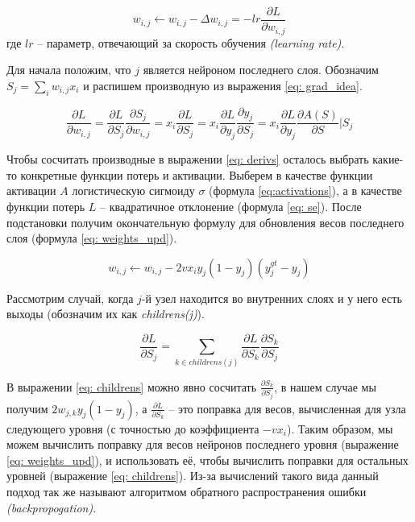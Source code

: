 \begin{equation}\label{eq: grad_idea}
    w_{i, j} \leftarrow w_{i, j} - \Delta w_{i,j} = - lr \frac{\partial L}{\partial w_{i, j}}
\end{equation}
где $lr$ -- параметр, отвечающий за скорость обучения \textit{(learning rate)}.

Для начала положим, что $j$ является 
нейроном последнего слоя. Обозначим $S_{j} = \sum_{i} w_{i, j} x_{i}$ и
распишем производную из выражения \ref{eq: grad_idea}.

\begin{equation}\label{eq: derivs}
    \frac{\partial L}{\partial w_{i, j}} = 
    \frac{\partial L}{\partial S_j} \frac{\partial S_j}{\partial w_{i, j}} =
    x_i \frac{\partial L}{\partial S_j} =
    x_i \frac{\partial L}{\partial y_j} \frac{\partial y_j}{\partial S_j} =
    x_i \frac{\partial L}{\partial y_j}  \frac{\partial A(S)}{\partial S} | S_j
\end{equation}

Чтобы сосчитать производные в выражении \ref{eq: derivs} осталось выбрать какие-то конкретные
функции потерь и активации. Выберем в качестве функции активации $A$ 
логистическую сигмоиду $\sigma$ (формула \ref{eq:activations}), а в качестве функции потерь
$L$ -- квадратичное отклонение (формула \ref{eq: se}). После подстановки получим
окончательную формулу для обновления весов последнего слоя (формула \ref{eq: weights_upd}).

\begin{equation}\label{eq: weights_upd}
    w_{i, j} \leftarrow w_{i, j} - 2 v x_i y_j (1 - y_j) (y^{gt}_j - y_j)
\end{equation}

Рассмотрим случай, когда $j$-й узел находится во внутренних слоях и 
у него есть выходы (обозначим их как \textit{childrens(j)}).

\begin{equation}\label{eq: childrens}
    \frac{\partial L}{\partial S_j} = 
    \sum_{k \in childrens(j)} \frac{\partial L}{\partial S_k} \frac{\partial S_k}{\partial S_j} 
\end{equation}


\indent
\indent
В выражении \ref{eq: childrens} можно явно сосчитать 
$\frac{\partial S_k}{\partial S_j}$, в нашем случае мы получим 
$2 w_{j, k} y_j (1 - y_j)$, а $\frac{\partial L}{\partial S_k}$ -- это поправка для весов, вычисленная для узла 
следующего уровня (с точностью до коэффициента $-v x_i$). Таким образом, мы можем вычислить
поправку для весов нейронов последнего уровня (выражение \ref{eq: weights_upd}), и использовать
её, чтобы вычислить поправки для остальных уровней
(выражение \ref{eq: childrens}). Из-за вычислений такого вида
 данный подход так же называют алгоритмом обратного распространения ошибки \textit{(backpropogation)}.
 

